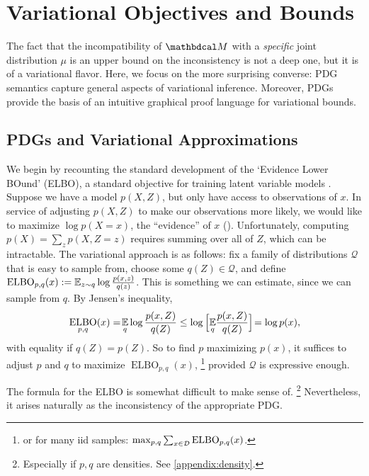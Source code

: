 \section{Variational Objectives and Bounds}
\label{sec:theory}


The fact that the incompatibility of $\dg M$ with a \emph{specific} joint distribution $\mu$ is an upper bound on the inconsistency is not a deep one, but it is of a variational flavor.
Here, we focus on the more surprising converse:  PDG semantics capture general aspects of variational inference.
Moreover, PDGs provide the basis of an intuitive graphical proof language for variational bounds.

\subsection{PDGs and Variational Approximations}
\label{sec:variational}
\def\ELBO{\mathop{\mathrm{ELBO}}}

We begin by recounting the standard development of the `Evidence Lower BOund' (ELBO), a standard objective for training latent variable models \parencite[\S2.2]{blei2017variational}.
Suppose we have a model $p(X,Z)$, but only have access to observations of $x$.
In service of adjusting $p(X,Z)$ to make our observations more likely, we would like to maximize $\log p(X\!\!=\!x)$, the ``evidence'' of $x$ ().
Unfortunately, computing $p(X) = \sum_z p(X,Z\!\!=\!z)$ requires summing over all of $Z$, which can be intractable.
The variational approach is as follows: fix a family of distributions $\mathcal Q$ that is easy to sample from, choose some $q(Z) \in \mathcal Q$, and define
$\mathrm{ELBO}_{p,q}(x) := \operatorname*{\mathbb{E}}_{z \sim q} \log \frac{p(x,z)}{q(z)}$.
This is something we can estimate, since we can sample from $q$. By Jensen's inequality,
\[
    \ELBO\limits_{p,q}(x)
    =\! \Ex_{q} \log \frac{p(x,Z)}{q(Z)}
    \le  \log \Big[\! \Ex_{q}\! \frac{p(x,Z)}{q(Z)} \Big]\!
    = \log p(x),
\]
with equality if $q(Z) = p(Z)$.
So to find $p$ maximizing $p(x)$, it suffices to adjust $p$ and $q$ to maximize $\ELBO_{p,q}(x)$,%
    \footnote{or for many iid samples: $\max_{p,q}\sum_{x \in \xsamp}\ELBO_{p,q}(x)$.}
 provided $\mathcal Q$ is expressive enough.


The formula for the ELBO is somewhat difficult to make sense of.%
\footnote{Especially if $p, q$ are densities. See \cref{appendix:density}.}
Nevertheless, it arises naturally as the inconsistency of the
appropriate PDG.

